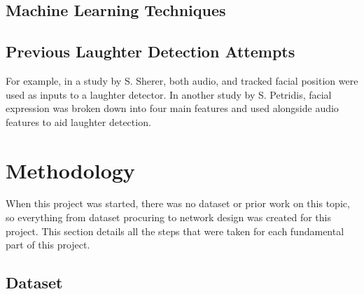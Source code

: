 \documentclass[a4paper,11pt,notitlepage]{article}
\begin{document}
\subsection{Machine Learning Techniques}


\subsection{Previous Laughter Detection Attempts}


For example, in a study by S. Sherer, both audio, and tracked facial position were used as inputs to a laughter detector.\cite{scherer2009multimodal} In another study by S. Petridis, facial expression was broken down into four main features and used alongside audio features to aid laughter detection.\cite{petridis2008audiovisual}

\section{Methodology}


When this project was started, there was no dataset or prior work on this topic, so everything from dataset procuring to network design was created for this project. This section details all the steps that were taken for each fundamental part of this project.

\subsection{Dataset}

\end{document}
